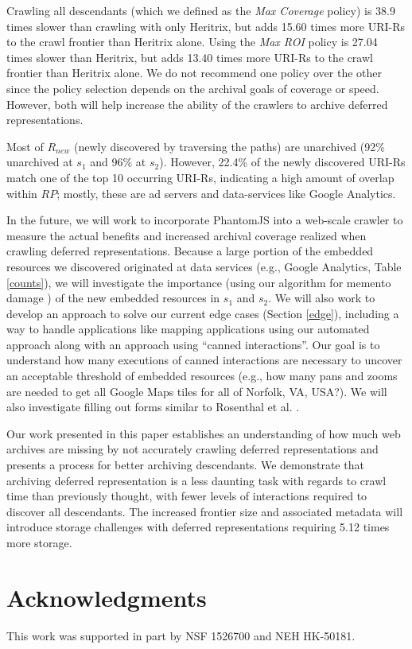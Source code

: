 \documentclass{sig-alternate}
\begin{document}
Crawling all descendants (which we defined as the \emph{Max Coverage} policy) is 38.9 times slower than crawling with only Heritrix, but adds 15.60 times more URI-Rs to the crawl frontier than Heritrix alone. Using the \emph{Max ROI} policy is 27.04 times slower than Heritrix, but adds 13.40 times more URI-Rs to the crawl frontier than Heritrix alone. 
We do not recommend one policy over the other since the policy selection depends on the archival goals of coverage or speed. However, both will help increase the ability of the crawlers to archive deferred representations. 

Most of $R_{new}$ (newly discovered by traversing the paths) are unarchived (92\% unarchived at $s_1$ and 96\% at $s_2$). However, 22.4\% of the newly discovered URI-Rs match one of the top 10 occurring URI-Rs, indicating a high amount of overlap within $RP$; mostly, these are ad servers and data-services like Google Analytics. 

In the future, we will work to incorporate PhantomJS into a web-scale crawler to measure the actual benefits and increased archival coverage realized when crawling deferred representations. Because a large portion of the embedded resources we discovered originated at data services (e.g., Google Analytics, Table \ref{counts}), we will investigate the importance (using our algorithm for memento damage \cite{brunelleDamage, damageIJDL}) of the new embedded resources in $s_1$ and $s_2$. We will also work to develop an approach to solve our current edge cases (Section \ref{edge}), including a way to handle applications like mapping applications using our automated approach along with an approach using ``canned interactions''. Our goal is to understand how many executions of canned interactions are necessary to uncover an acceptable threshold of embedded resources (e.g., how many pans and zooms are needed to get all Google Maps tiles for all of Norfolk, VA, USA?). We will also investigate filling out forms similar to Rosenthal et al. \cite{dshrDlib}.

Our work presented in this paper establishes an understanding of how much web archives are missing by not accurately crawling deferred representations and presents a process for better archiving descendants. We demonstrate that archiving deferred representation is a less daunting task with regards to crawl time than previously thought, with fewer levels of interactions required to discover all descendants. The increased frontier size and associated metadata will introduce storage challenges with deferred representations requiring 5.12 times more storage.



\section{Acknowledgments}
This work was supported in part by NSF 1526700 and NEH HK-50181.



  
\end{document}

